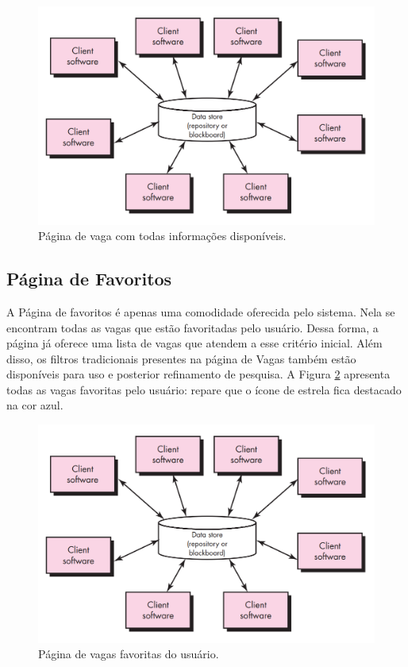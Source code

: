 \documentclass[cic,tc]{iiufrgs}
\begin{document}
\begin{figure}[ht]
    \caption{Página de vaga com todas informações disponíveis.}
        \begin{center}
            \includegraphics[width=1\textwidth]{figuras/arquitetura-centralizada-dados.png}
        \end{center}
    \label{telaVagaCompleta}
\end{figure}

\subsection{Página de Favoritos}
\label{PDVFunFavoritos}

A Página de favoritos é apenas uma comodidade oferecida pelo sistema. Nela se encontram todas as vagas que estão favoritadas pelo usuário. Dessa forma, a página já oferece uma lista de vagas que atendem a esse critério inicial. Além disso, os filtros tradicionais presentes na página de Vagas também estão disponíveis para uso e posterior refinamento de pesquisa. A Figura \ref{telaVagaFav} apresenta todas as vagas favoritas pelo usuário: repare que o ícone de estrela fica destacado na cor azul.

\begin{figure}[ht]
    \caption{Página de vagas favoritas do usuário.}
        \begin{center}
            \includegraphics[width=1\textwidth]{figuras/arquitetura-centralizada-dados.png}
        \end{center}
    \label{telaVagaFav}
\end{figure}
\end{document}
